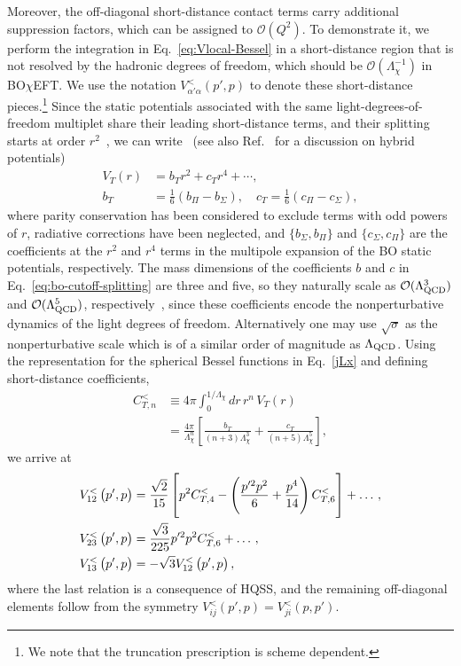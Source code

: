 \documentclass[aps,prd,showpacs,amsmath,twocolumn,superscriptaddress,floatfix,nofootinbib,notitlepage]{revtex4-2}
\newcommand{\be}{\begin{equation}}
\newcommand{\ee}{\end{equation}}
\newcommand{\BOchiEFT}{BO$\chi$EFT\xspace}
\begin{document}
Moreover, the off-diagonal short-distance contact terms carry additional suppression factors, which can be assigned to $\mathcal{O}(Q^2)$.
To demonstrate it, we perform the integration in Eq.~\eqref{eq:Vlocal-Bessel} in a short-distance region that is not resolved by the hadronic degrees of freedom, which should be $\mathcal{O}(\Lambda_\chi^{-1})$ in \BOchiEFT. We use the notation $V^{<}_{\alpha' \alpha}(p',p)$ to denote these short-distance pieces.\footnote{We note that the truncation prescription is scheme dependent.}
Since the static potentials associated with the same light-degrees-of-freedom multiplet share their leading short-distance terms, and their splitting starts at order $r^2$~\cite{Brambilla:2017uyf,Berwein:2024ztx}, we can write~\cite{Brambilla:2024imu} (see also Ref.~\cite{Bali:2003jq} for a discussion on hybrid potentials)
\begin{equation}
\begin{split}
V_T(r)&=b_T r^2+c_T r^4+\cdots,\\
b_T&=\frac16(b_\Pi-b_\Sigma),\quad
c_T=\frac16(c_\Pi-c_\Sigma),
\end{split}
\label{eq:bo-cutoff-splitting}
\end{equation}
where parity conservation has been considered to exclude terms with odd powers of $r$,  radiative corrections have been neglected, and $\{b_\Sigma,b_\Pi\}$ and $\{c_\Sigma,c_\Pi\}$ are the coefficients at the $r^2$ and $r^4$ terms in the multipole expansion of the BO static potentials, respectively. The mass dimensions of the coefficients $b$ and $c$ in Eq.~\eqref{eq:bo-cutoff-splitting} are three and five, so they naturally scale as $\mathcal{O}(\Lambda_{\rm QCD}^3)$ and $\mathcal{O}(\Lambda_{\rm QCD}^5)$, respectively~\cite{Brambilla:2017uyf, Berwein:2024ztx},
since these coefficients encode the nonperturbative dynamics of the light degrees of freedom. Alternatively one may use $\sqrt{\sigma}$ as the nonperturbative scale which is of a similar order of magnitude as $\Lambda_{\rm QCD}$.
Using the representation for the spherical Bessel functions in Eq.~\eqref{jLx} and defining short-distance coefficients,
\be 
\begin{split}
C^<_{T,n} &\equiv 4\pi \int _0^{1/\Lambda_\chi} dr\, r^n\, V_T(r) \\
&= \frac{4\pi}{\Lambda_\chi^n} \left[\frac{b_T}{(n+3) \Lambda_\chi^3}+\frac{c_T}{(n+5) \Lambda_\chi^5}\right],
\end{split}
\ee 
we arrive at 
\begin{align}
V_{12}^{<}\left(p^{\prime}, p\right) &=   \frac{\sqrt{2}}{15}\left[p^2 C_{T,4}^< -\left(\frac{p^{\prime 2} p^2}{6}+\frac{p^4}{14}\right) C_{T,6}^< \right]+\ldots\,, \notag\\
V_{23}^{<}\left(p^{\prime}, p\right) &= \frac{ \sqrt{3}}{225} p^{\prime 2} p^2 C_{T,6}^< +\ldots\,,\\
V_{13}^{<}\left(p^{\prime}, p\right) &= -\sqrt{3}
V_{12}^{<}\left(p^{\prime}, p\right),\notag
\end{align}
where the last relation is a consequence of HQSS, and the remaining off-diagonal elements follow from the symmetry $V_{ij}^<(p',p) = V_{ji}^<(p, p')$.
\end{document}

